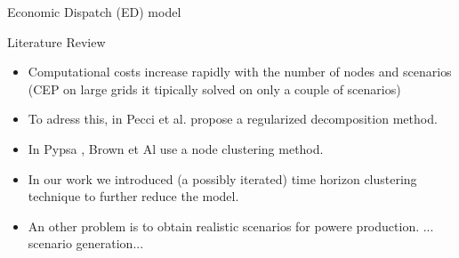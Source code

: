 \begin{frame}{Economic Dispatch (ED) model \; }
  
  \end{frame}
  
  \begin{frame}{Literature Review}
  
    \begin{itemize}
      \item Computational costs increase rapidly with the number of nodes and scenarios (CEP on large grids it tipically solved on only a couple of scenarios)
      \item To adress this, in \cite{pecci2024regularizedbendersdecompositionhigh} Pecci et al. propose a regularized decomposition method.
      \item  In Pypsa \cite*{HORSCH2018207}, Brown et Al use a node clustering method.
      \item In our work we introduced (a possibly iterated) time horizon clustering technique to further reduce the model.
      \item An other problem is to obtain realistic scenarios for powere production. ... scenario generation...
    \end{itemize}
  
  \end{frame}
